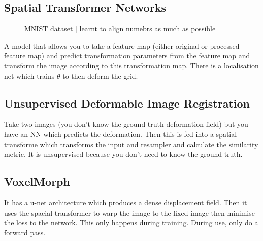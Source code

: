 \documentclass[11pt]{article}
\begin{document}
\subsection{Spatial Transformer Networks}

\begin{figure}[H]
    \centering
    \caption*{MNIST dataset | learnt to align numebrs as much as possible}
\end{figure}

A model that allows you to take a feature map (either original or processed feature map) and predict transformation parameters from the feature map and transform the image according to this transformation map. There is a localisation net which trains $\theta$ to then deform the grid. 

\subsection{Unsupervised Deformable Image Registration}

\begin{figure}[H]
    \centering
\end{figure}

Take two images (you don't know the ground truth deformation field) but you have an NN which predicts the deformation. Then this is fed into a spatial transforme which transforms the input and resampler and calculate the similarity metric. It is unsupervised because you don't need to know the ground truth.

\subsection{VoxelMorph}

\begin{figure}[H]
    \centering
\end{figure}

It has a u-net architecture which produces a dense displacement field. Then it uses the spacial transformer to warp the image to the fixed image then minimise the loss to the network. This only happens during training. During use, only do a forward pass. 

\printbibliography
{}
\end{document}
